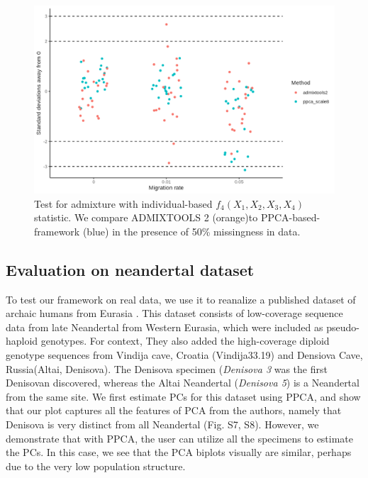\documentclass[12pt, letterpaper]{article}
\begin{document}
\begin{figure}[ht!]
    \includegraphics[width=16.5cm]{plots/simfiles/AvgFolder/Ne1000/split_times1000/npop10_nind100/missing0.5/plots_8/hypothesis_test_comparison.png}
    \centering
         \caption{Test for admixture with individual-based $f_4(X_1, X_2, X_3, X_4)$ statistic. We compare ADMIXTOOLS 2 (orange)to PPCA-based-framework (blue) in the presence of 50\% missingness in data.}
    \label{fig:admixture}
\end{figure}

\subsection{Evaluation on neandertal dataset}

To test our framework on real data, we use it to reanalize a published dataset of archaic humans from Eurasia \cite{hajdinjak_reconstructing_2018}. This dataset consists of  low-coverage sequence data from late Neandertal from Western Eurasia, which were included as pseudo-haploid genotypes. For context, They also added the high-coverage diploid genotype sequences from Vindija cave, Croatia (Vindija33.19)\citep{prufer_high-coverage_2017} and Densiova Cave, Russia(Altai, Denisova)\citep{prufer_complete_2014, meyer_2012}. The Denisova specimen (\textit{Denisova 3} was the first Denisovan discovered, whereas the Altai Neandertal (\textit{Denisova 5}) is a Neandertal from the same site. We first estimate PCs for this dataset using PPCA, and show that our plot captures all the features of PCA from the authors, namely that Denisova is very distinct from all Neandertal (Fig. S7, S8). However, we demonstrate that with PPCA, the user can utilize all the specimens to estimate the PCs. In this case, we see that the PCA biplots visually are similar, perhaps due to the very low population structure. 
\end{document}
